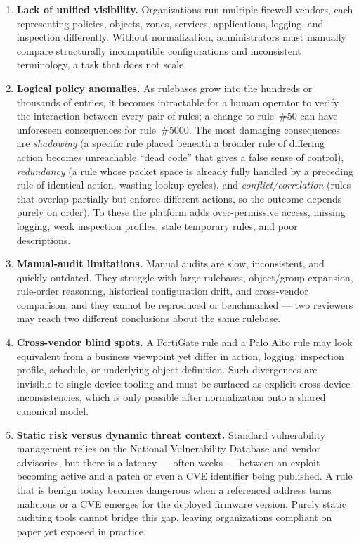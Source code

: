 \begin{enumerate}[leftmargin=1.6em, label=\textbf{P\arabic*.}]
  \item \textbf{Lack of unified visibility.} Organizations run multiple firewall vendors, each representing policies, objects, zones, services, applications, logging, and inspection differently. Without normalization, administrators must manually compare structurally incompatible configurations and inconsistent terminology, a task that does not scale.
  \item \textbf{Logical policy anomalies.} As rulebases grow into the hundreds or thousands of entries, it becomes intractable for a human operator to verify the interaction between every pair of rules; a change to rule~\#50 can have unforeseen consequences for rule~\#5000. The most damaging consequences are \emph{shadowing} (a specific rule placed beneath a broader rule of differing action becomes unreachable ``dead code'' that gives a false sense of control), \emph{redundancy} (a rule whose packet space is already fully handled by a preceding rule of identical action, wasting lookup cycles), and \emph{conflict/correlation} (rules that overlap partially but enforce different actions, so the outcome depends purely on order). To these the platform adds over-permissive access, missing logging, weak inspection profiles, stale temporary rules, and poor descriptions.
  \item \textbf{Manual-audit limitations.} Manual audits are slow, inconsistent, and quickly outdated. They struggle with large rulebases, object/group expansion, rule-order reasoning, historical configuration drift, and cross-vendor comparison, and they cannot be reproduced or benchmarked --- two reviewers may reach two different conclusions about the same rulebase.
  \item \textbf{Cross-vendor blind spots.} A FortiGate rule and a Palo Alto rule may look equivalent from a business viewpoint yet differ in action, logging, inspection profile, schedule, or underlying object definition. Such divergences are invisible to single-device tooling and must be surfaced as explicit cross-device inconsistencies, which is only possible after normalization onto a shared canonical model.
  \item \textbf{Static risk versus dynamic threat context.} Standard vulnerability management relies on the National Vulnerability Database and vendor advisories, but there is a latency --- often weeks --- between an exploit becoming active and a patch or even a CVE identifier being published. A rule that is benign today becomes dangerous when a referenced address turns malicious or a CVE emerges for the deployed firmware version. Purely static auditing tools cannot bridge this gap, leaving organizations compliant on paper yet exposed in practice.
\end{enumerate}

